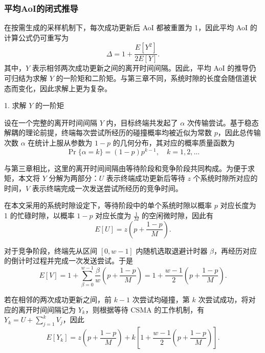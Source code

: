 \subsubsection{平均AoI的闭式推导}

在按需生成的采样机制下，每次成功更新后 AoI 都被重置为 1，因此平均 AoI 的计算公式仍可重写为
\begin{equation}\label{cp4_avg_aoi}
    \Delta = 1 + \frac{E[Y^2]}{2E[Y]}.
\end{equation}
其中，$Y$ 表示相邻两次成功更新之间的离开时间间隔。因此，平均 AoI 的推导仍可归结为求解 $Y$ 的一阶矩和二阶矩。与第三章不同，系统时隙的长度会随信道状态而变化，因此求解上更为复杂。

1. 求解 $Y$ 的一阶矩

    设在一个完整的离开时间间隔 $Y$ 内，目标终端共发起了 $\alpha$ 次传输尝试。基于稳态解耦的理论前提，终端每次尝试所经历的碰撞概率均被近似为常数 $p$，因此总传输次数 $\alpha$ 在统计上服从参数为 $1-p$ 的几何分布，其对应的概率质量函数为
    \begin{equation}\label{cp4_alpha}
        \Pr\{\alpha=k\}=(1-p)p^{k-1}, \quad k=1,2,\dots
    \end{equation}

    与第三章相比，这里的离开时间间隔由等待阶段和竞争阶段共同构成。为便于求矩，本文将 $Y$ 分解为两部分：$U$ 表示终端成功更新后等待 $z$ 个系统时隙所对应的时间，$V$ 表示终端完成一次发送尝试所经历的竞争时间。

    在本文采用的系统时隙设定下，等待阶段中的单个系统时隙以概率 $p$ 对应长度为 1 的忙碌时隙，以概率 $1-p$ 对应长度为 $\frac{1}{M}$ 的空闲微时隙，因此有
    \begin{equation}\label{cp4_EU}
        E[U] = z\left(p+\frac{1-p}{M}\right).
    \end{equation}

    对于竞争阶段，终端先从区间 $[0,w-1]$ 内随机选取退避计时器 $\beta$，再经历对应的倒计时过程并完成一次发送尝试。于是
    \begin{equation}\label{cp4_EV}
        E[V] = 1 + \sum_{\beta=0}^{w-1}\frac{\beta}{w}\left(p+\frac{1-p}{M}\right)
        = 1+\frac{w-1}{2}\left(p+\frac{1-p}{M}\right).
    \end{equation}

    若在相邻的两次成功更新之间，前 $k-1$ 次尝试均碰撞，第 $k$ 次尝试成功，将对应的离开时间间隔记为 $Y_k$，则根据等待 CSMA 的工作机制，有 $Y_k = U+\sum_{j=1}^{k}V_j$，因此
    \begin{equation}\label{cp4_EYk}
        E[Y_k] = z \left( p + \frac{1-p}{M} \right) + k \left[ 1 + \frac{w-1}{2} \left( p + \frac{1-p}{M} \right) \right].
    \end{equation}

